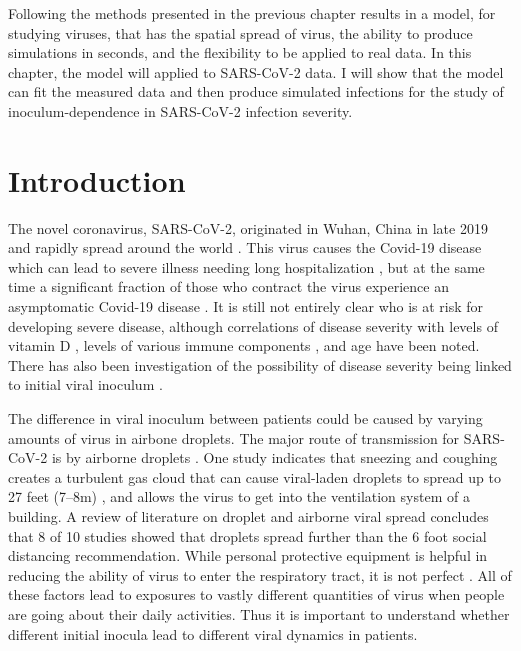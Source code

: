 
Following the methods presented in the previous chapter results in a model, for studying viruses, that has the spatial spread of virus, the ability to produce simulations in seconds, and the flexibility to be applied to real data. In this chapter, the model will applied to SARS-CoV-2 data. I will show that the model can fit the measured data and then produce simulated infections for the study of inoculum-dependence in SARS-CoV-2 infection severity.

\section{Introduction}

The novel coronavirus, SARS-CoV-2, originated in Wuhan, China in late 2019 and rapidly spread around the world \citep{chen20,wu20}. This virus causes the Covid-19 disease which can lead to severe illness needing long hospitalization \citep{sun20,goyal20,jiang20}, but at the same time a significant fraction of those who contract the virus experience an asymptomatic Covid-19 disease \citep{he20}. It is still not entirely clear who is at risk for developing severe disease, although correlations of disease severity with levels of vitamin D \citep{ilie20}, levels of various immune components \citep{liu20imm,liu20imm2,zhang20imm,yang20imm}, and age \citep{borghesi20,zhang20imm} have been noted. There has also been investigation of the possibility of disease severity being linked to initial viral inoculum \citep{little20, guallar20, ghandi20}.

The difference in viral inoculum between patients could be caused by varying amounts of virus in airbone droplets. The major route of transmission for SARS-CoV-2 is by airborne droplets \citep{morawska20}. One study indicates that sneezing and coughing creates a turbulent gas cloud that can cause viral-laden droplets to spread up to 27 feet (\numrange[range-phrase = --]{7}{8}\si{\meter}) \citep{bourouiba20}, and allows the virus to get into the ventilation system of a building. A review of literature on droplet and airborne viral spread concludes that 8 of 10 studies showed that droplets spread further than the 6 foot \citep{bahl20} social distancing recommendation. While personal protective equipment is helpful in reducing the ability of virus to enter the respiratory tract, it is not perfect \citep{mittal20}. All of these factors lead to exposures to vastly different quantities of virus when people are going about their daily activities. Thus it is important to understand whether different initial inocula lead to different viral dynamics in patients. 

